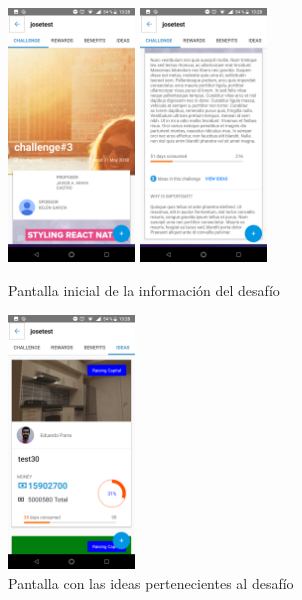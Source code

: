 \begin{figure}[!h]
	\begin{center}
		\includegraphics[width=0.3\textwidth]{./img/anexo1/ver_desafio_inicio.png}
		\includegraphics[width=0.3\textwidth]{./img/anexo1/ver_desafio_inicio_cont.png}
		\caption{Pantalla inicial de la información del desafío}
		\label{fig:ver_desafio_inicio}
	\end{center}
\end{figure}

\begin{figure}[!h]
	\begin{center}
		\includegraphics[width=0.3\textwidth]{./img/anexo1/ver_desafio_ideas.png}
		\caption{Pantalla con las ideas pertenecientes al desafío}
		\label{fig:ver_desafio_inicio_ideas}
	\end{center}
\end{figure}

